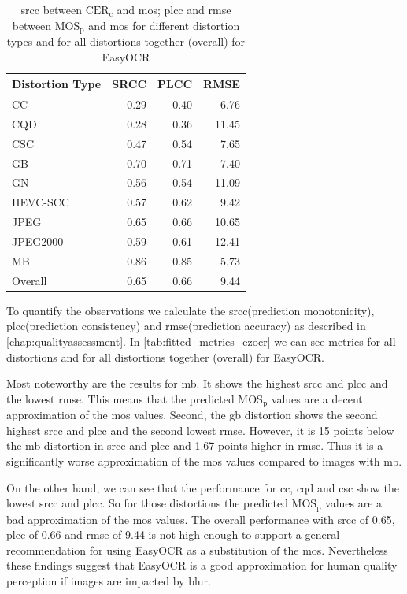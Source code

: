\begin{table}[h!]
    \centering
    \begin{tabular}{|l|rrr|}
        \hline
        Distortion Type & SRCC & PLCC & RMSE \\
        \hline
        \hline
        CC & 0.29 & 0.40 & 6.76 \\
        CQD & 0.28 & 0.36 & 11.45 \\
        CSC & 0.47 & 0.54 & 7.65 \\
        GB & 0.70 & 0.71 & 7.40 \\
        GN & 0.56 & 0.54 & 11.09 \\
        HEVC-SCC & 0.57 & 0.62 & 9.42 \\
        JPEG & 0.65 & 0.66 & 10.65 \\
        JPEG2000 & 0.59 & 0.61 & 12.41 \\
        MB & 0.86 & 0.85 & 5.73 \\
        \hline
        Overall & 0.65 & 0.66 & 9.44 \\
        \hline
    \end{tabular}
    \caption{\gls{srcc} between $\text{CER}_{\text{c}}$ and \gls{mos}; \gls{plcc} and \gls{rmse} between $\text{MOS}_{\text{p}}$ and \gls{mos} for different distortion types and for all distortions together (overall) for EasyOCR}
    \label{tab:fitted_metrics_ezocr}
\end{table}

To quantify the observations we calculate the \gls{srcc}(prediction monotonicity), \gls{plcc}(prediction consistency) and \gls{rmse}(prediction accuracy) as described in \autoref{chap:qualityassessment}.
In \autoref{tab:fitted_metrics_ezocr} we can see metrics for all distortions and for all distortions together (overall) for EasyOCR.

Most noteworthy are the results for \gls{mb}.
It shows the highest \gls{srcc} and \gls{plcc} and the lowest \gls{rmse}.
This means that the predicted $\text{MOS}_{\text{p}}$ values are a decent approximation of the \gls{mos} values.
Second, the \gls{gb} distortion shows the second highest \gls{srcc} and \gls{plcc} and the second lowest \gls{rmse}.
However, it is 15 points below the \gls{mb} distortion in \gls{srcc} and \gls{plcc} and 1.67 points higher in \gls{rmse}.
Thus it is a significantly worse approximation of the \gls{mos} values compared to images with \gls{mb}.

On the other hand, we can see that the performance for \gls{cc}, \gls{cqd} and \gls{csc} show the lowest \gls{srcc} and \gls{plcc}.
So for those distortions the predicted $\text{MOS}_{\text{p}}$ values are a bad approximation of the \gls{mos} values.
The overall performance with \gls{srcc} of 0.65, \gls{plcc} of 0.66 and \gls{rmse} of 9.44 is not high enough to support a general recommendation for using EasyOCR as a substitution of the \gls{mos}.
Nevertheless these findings suggest that EasyOCR is a good approximation for human quality perception if images are impacted by blur.

